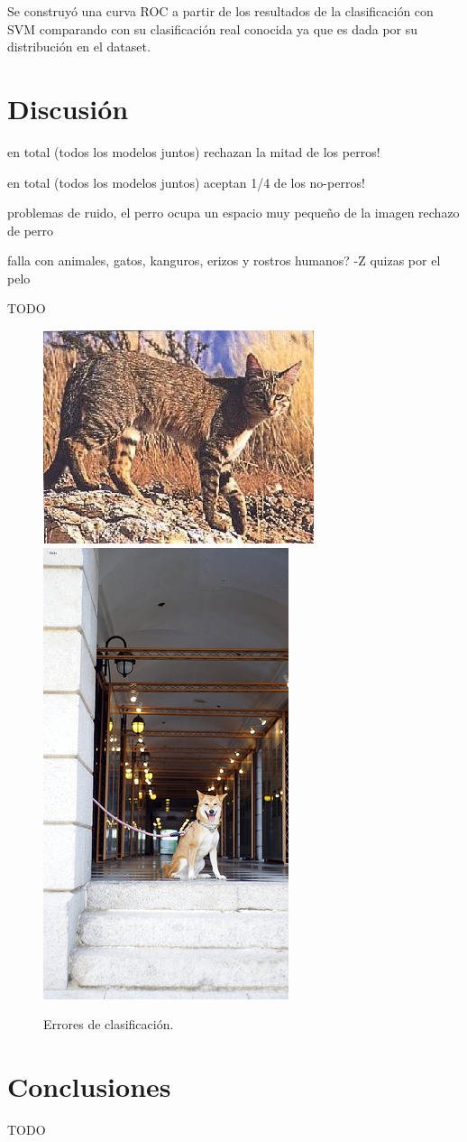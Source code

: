 \documentclass[12pt]{article}
\begin{document}
Se construyó una curva ROC a partir de los resultados de la clasificación con SVM comparando con su clasificación real conocida ya que es dada por su distribución en el dataset.

\section{Discusión}

en total (todos los modelos juntos) rechazan la mitad de los perros!

en total (todos los modelos juntos) aceptan 1/4 de los no-perros!

problemas de ruido, el perro ocupa un espacio muy pequeño de la imagen rechazo de perro

falla con animales, gatos, kanguros, erizos y rostros humanos? -Z quizas por el pelo

TODO

\begin{figure}[H]
    \centering
{\includegraphics[scale=0.5]{../no-dogs/eval/96.jpg}}
{\includegraphics[scale=1.5]{../dogs/eval/122.jpg}}
    \caption{Errores de clasificación.}
\end{figure}

\section{Conclusiones}
TODO






\end{document}
